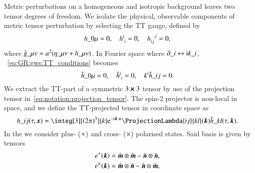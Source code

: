 Metric perturbations on a homogeneous and isotropic background leaves two tensor degrees of freedom. %
We isolate the physical, observable components of metric tensor perturbation by selecting the TT gauge, %
defined by
\begin{equation}\label{eq:GR:gws:TT_conditions}
    h\_{0\mu} = 0, \quad h\indices{^i_i} = 0, \quad h\indices{_{ij}^{,i}}=0,
\end{equation}
where $\pert{g}\_{\mu\nu}= a^2 (\eta\_{\mu\nu}+h\_{\mu\nu})$. In Fourier space where $\partial\_i \leftrightarrow \mathrm{i} k\_i $, ~\cref{eq:GR:gws:TT_conditions} becomes
\begin{equation}\label{eq:GR:gws:TT_conditions_Ft}
    \Ft{h}\_{0\mu} = 0, \quad \Ft{h}\indices{^i_i} = 0, \quad k\^i \Ft{h}\_{ij}=0.
\end{equation}
We extract the TT-part of a symmetric $3\cross 3$ tensor by use of the projection tensor in~\cref{eq:notation:projection_tensor}. %
The spin-2 projector is non-local in space, and we define the TT-projected tensor in coordinate space as
\begin{equation}
    h\_{ij}(\tau, \vec{x}) = \integ[3][(2\ppi)^3]{k}  \eu[-\im \vec{k}\cdot \vec{x}] \ProjectionLambda{ij}{kl}(\vec{k}) \Ft{h}\_{kl}(\tau, \vec{k}). %
\end{equation}
In the  we consider plus- ($+$) and cross- ($\times$) polarised states. Said basis is given by tensors~\citep{maggioreGravitationalWavesVol2007}
\begin{equation}
    \begin{split}
        e^\polplus  (\vec{k}) &= \mhat \otimes \mhat - \nhat \otimes \nhat,\\%
        e^\polcross (\vec{k}) &= \mhat \otimes \nhat - \nhat \otimes \mhat,
    \end{split}
\end{equation}
